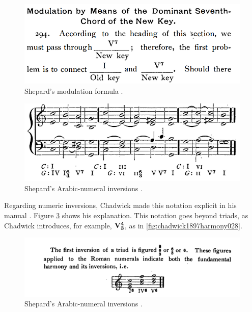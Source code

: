 \begin{figure}
    \centering
    \includegraphics[width=\textwidth]{figures/chapter/2/primary_sources/shepard1896harmony179.png}
    \caption{Shepard's modulation formula \textcite{shepard1896harmony}.}
    \label{fig:shepard1896harmony179}
\end{figure}

\begin{figure}
    \centering
    \includegraphics[width=\textwidth]{figures/chapter/2/primary_sources/shepard1896harmony184.png}
    \caption{Shepard's Arabic-numeral inversions \textcite{shepard1896harmony}.}
    \label{fig:shepard1896harmony184}
\end{figure}

Regarding numeric inversions, Chadwick made this notation explicit in his manual \textcite{chadwick1897harmony}. 
Figure \ref{fig:chadwick1897harmony012} shows his explanation.
This notation goes beyond triads, as Chadwick introduces, for example, 
$\textbf{V}\relax\relax{\footnotesize {}^\textbf{4}\relax_\textbf{3}\relax\relax}$, as in \ref{fig:chadwick1897harmony028}.

\begin{figure}
    \centering
    \includegraphics[width=\textwidth]{figures/chapter/2/primary_sources/chadwick1897harmony012.png}
    \caption{Shepard's Arabic-numeral inversions \textcite{chadwick1897harmony}.}
    \label{fig:chadwick1897harmony012}
\end{figure}

